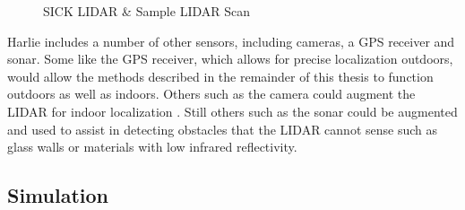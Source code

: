 \begin{figure}
\centering
{}
\hfill
{}
\caption{SICK LIDAR \& Sample LIDAR Scan}
\label{fig:sick_and_sample_scan}
\end{figure}

Harlie includes a number of other sensors, including cameras, a GPS receiver and sonar. Some like the GPS receiver, which allows for precise localization outdoors, would allow the methods described in the remainder of this thesis to function outdoors as well as indoors. Others such as the camera could augment the LIDAR for indoor localization \autocite{Harper2009}. Still others such as the sonar could be augmented and used to assist in detecting obstacles that the LIDAR cannot sense such as glass walls or materials with low infrared reflectivity.

\subsection{Simulation}\label{subsec:simulation_setup}

